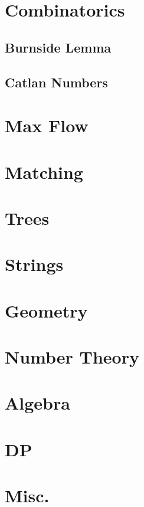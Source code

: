 \section{Combinatorics}
\subsection{Burnside Lemma}
\raggedbottom
\hrulefill
\subsection{Catlan Numbers}
\raggedbottom
\hrulefill

\section{Max Flow}

\section{Matching}

\section{Trees}

\section{Strings}

\section{Geometry}

\section{Number Theory}

\section{Algebra}

\section{DP}

\section{Misc.}

